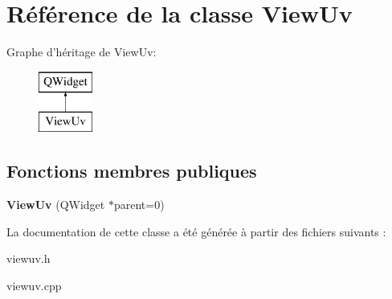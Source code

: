 \hypertarget{class_view_uv}{\section{Référence de la classe View\+Uv}
\label{class_view_uv}
}
Graphe d'héritage de View\+Uv\+:\begin{figure}[H]
\begin{center}
\leavevmode
\includegraphics[height=2.000000cm]{class_view_uv}
\end{center}
\end{figure}
\subsection*{Fonctions membres publiques}
\begin{DoxyCompactItemize}
\item 
\hypertarget{class_view_uv_a234d80938d244e3682470a86463a9195}{{\bfseries View\+Uv} (Q\+Widget $\ast$parent=0)}\label{class_view_uv_a234d80938d244e3682470a86463a9195}

\end{DoxyCompactItemize}


La documentation de cette classe a été générée à partir des fichiers suivants \+:\begin{DoxyCompactItemize}
\item 
viewuv.\+h\item 
viewuv.\+cpp\end{DoxyCompactItemize}
